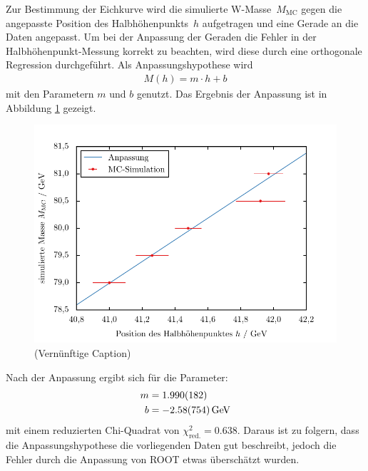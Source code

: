 \documentclass[11pt, a4paper]{article}
\numberwithin{equation}{section}
\newcommand{\korr}[1]{{\color{red}(#1)}}
\begin{document}
Zur Bestimmung der Eichkurve wird die simulierte W-Masse~$M_\mathrm{MC}$ gegen die angepasste Position des Halbhöhenpunkts~$h$ aufgetragen und eine Gerade an die Daten angepasst.
Um bei der Anpassung der Geraden die Fehler in der Halbhöhenpunkt-Messung korrekt zu beachten, wird diese durch eine orthogonale Regression \cite{odr} durchgeführt.
Als Anpassungshypothese wird
\begin{align*}
	M(h) = m \cdot h + b
\end{align*}
mit den Parametern $m$ und $b$ genutzt.
Das Ergebnis der Anpassung ist in Abbildung \ref{fig:gauge_curve} gezeigt.
\begin{figure}[h]
	\centering
	\includegraphics{./figures/wmass/gauge.pdf}
	\caption{\korr{Vernünftige Caption}}
	\label{fig:gauge_curve}
\end{figure}

Nach der Anpassung ergibt sich für die Parameter:
\begin{align*}
	m &= \num{1.990 +- 0.182} \\
	b &= \SI{-2.58 +- 7.54}{\GeV}
\end{align*}
mit einem reduzierten Chi-Quadrat von $\chi_\mathrm{red.}^2 = \num{0.638}$.
Daraus ist zu folgern, dass die Anpassungshypothese die vorliegenden Daten gut beschreibt, jedoch die Fehler durch die Anpassung von ROOT etwas überschätzt wurden.
\end{document}
